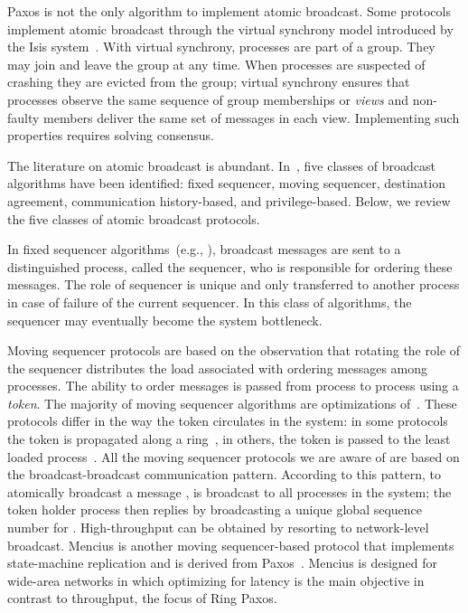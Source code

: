 \documentclass[final,3p,times,twocolumn,authoryear]{elsarticle}
\begin{document}
Paxos is not the only algorithm to implement atomic broadcast. 
Some protocols implement atomic broadcast through the virtual synchrony model introduced by the Isis system~\cite{BT87}. With virtual synchrony, processes are part of a group. They may join and leave the group at any time. When processes are suspected of crashing they are evicted from the group; virtual synchrony ensures that processes observe the same sequence of group memberships or \emph{views} and non-faulty members deliver the same set of messages in each view. Implementing such properties requires solving consensus. 

The literature on atomic broadcast is abundant. In~\cite{DUS04}, five classes of broadcast algorithms have been identified: fixed sequencer, moving sequencer, destination agreement, communication history-based, and privilege-based. Below, we review the five classes of atomic broadcast protocols.

In fixed sequencer algorithms~(e.g., \cite{BSS91,KT91}), broadcast messages are sent to a distinguished process, called the sequencer, who is responsible for ordering these messages. The role of sequencer is unique and only transferred to another process in case of failure of the current sequencer. In this class of algorithms, the sequencer may eventually become the system bottleneck. 

Moving sequencer protocols are based on the observation that rotating the role of the sequencer distributes the load associated with ordering messages among processes. The ability to order messages is passed from process to process using a \emph{token}. The majority of moving sequencer algorithms are optimizations of~\cite{CM84}. These protocols differ in the way the token circulates in the system: in some protocols the token is propagated along a ring~\cite{CM84,CM95}, in others, the token is passed to the least loaded process~\cite{KK97}. All the moving sequencer protocols we are aware of are based on the broadcast-broadcast communication pattern. According to this pattern, to atomically broadcast a message ,  is broadcast to all processes in the system; the token holder process then replies by broadcasting a unique global sequence number for . High-throughput can be obtained by resorting to network-level broadcast.
Mencius is another moving sequencer-based protocol that implements state-machine replication and is derived from Paxos~\cite{mao2008mencius}. 
Mencius is designed for wide-area networks in which optimizing for latency is the main objective in contrast to throughput, the focus of Ring Paxos. 
\end{document}
